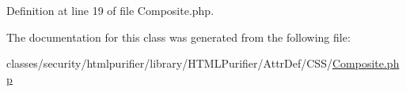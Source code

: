 Definition at line 19 of file Composite.\+php.



The documentation for this class was generated from the following file\+:\begin{DoxyCompactItemize}
\item 
classes/security/htmlpurifier/library/\+H\+T\+M\+L\+Purifier/\+Attr\+Def/\+C\+S\+S/\hyperlink{AttrDef_2CSS_2Composite_8php}{Composite.\+php}\end{DoxyCompactItemize}
